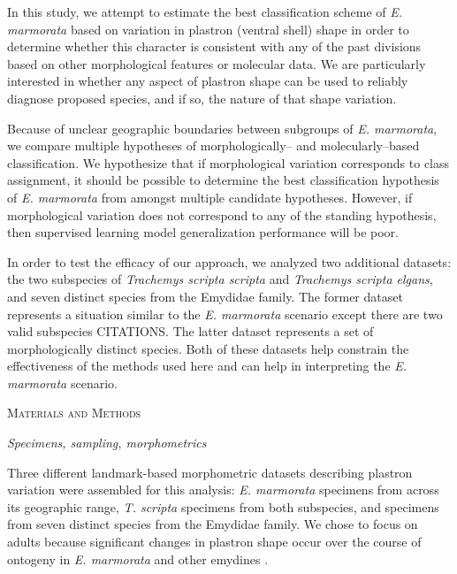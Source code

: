 \documentclass[12pt,letterpaper]{article}
\renewcommand{\section}[1]{%
\bigskip
\begin{center}
\begin{Large}
\normalfont\scshape #1
\medskip
\end{Large}
\end{center}}
\renewcommand{\subsection}[1]{%
\bigskip
\begin{center}
\begin{large}
\normalfont\itshape #1
\end{large}
\end{center}}
\begin{document}
In this study, we attempt to estimate the best classification scheme of \textit{E. marmorata} based on variation in plastron (ventral shell) shape in order to determine whether this character is consistent with any of the past divisions based on other morphological features or molecular data. We are particularly interested in whether any aspect of plastron shape can be used to reliably diagnose \citet{Spinks2014} proposed species, and if so, the nature of that shape variation.

Because of unclear geographic boundaries between subgroups of \textit{E. marmorata}, we compare multiple hypotheses of morphologically-- and molecularly--based classification. We hypothesize that if morphological variation corresponds to class assignment, it should be possible to determine the best classification hypothesis of \textit{E. marmorata} from amongst multiple candidate hypotheses. However, if morphological variation does not correspond to any of the standing hypothesis, then supervised learning model generalization performance will be poor.


In order to test the efficacy of our approach, we analyzed two additional datasets: the two subspecies of \textit{Trachemys scripta scripta} and \textit{Trachemys scripta elgans}, and seven distinct species from the Emydidae family. The former dataset represents a situation similar to the \textit{E. marmorata} scenario except there are two valid subspecies CITATIONS. The latter dataset represents a set of morphologically distinct species. Both of these datasets help constrain the effectiveness of the methods used here and can help in interpreting the \textit{E. marmorata} scenario.


\section{Materials and Methods}
\subsection{Specimens, sampling, morphometrics}
Three different landmark-based morphometric datasets describing plastron variation were assembled for this analysis: \textit{E. marmorata} specimens from across its geographic range, \textit{T. scripta} specimens from both subspecies, and specimens from seven distinct species from the Emydidae family. We chose to focus on adults because significant changes in plastron shape occur over the course of ontogeny in \textit{E. marmorata} and other emydines \citep{Angielczyk2013a}.
\end{document}
